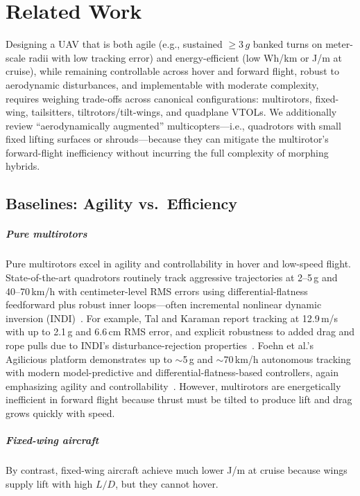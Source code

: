
\chapter{Related Work}\label{chapter:related-work}

Designing a UAV that is both agile (e.g., sustained $\geq 3\,g$ banked turns on meter-scale radii with low tracking error) and energy-efficient (low Wh/km or J/m at cruise), while remaining controllable across hover and forward flight, robust to aerodynamic disturbances, and implementable with moderate complexity, requires weighing trade-offs across canonical configurations: multirotors, fixed-wing, tailsitters, tiltrotors/tilt-wings, and quadplane VTOLs.
We additionally review ``aerodynamically augmented'' multicopters---i.e., quadrotors with small fixed lifting surfaces or shrouds---because they can mitigate the multirotor's forward-flight inefficiency without incurring the full complexity of morphing hybrids.


\section{Baselines: Agility vs.\ Efficiency}

\paragraph{Pure multirotors}
Pure multirotors excel in agility and controllability in hover and low-speed flight.
State-of-the-art quadrotors routinely track aggressive trajectories at 2--5\,g and 40--70\,km/h with centimeter-level RMS errors using differential-flatness feedforward plus robust inner loops---often incremental nonlinear dynamic inversion (INDI)~\cite{Tal2018,Tal2021,Foehn2022}.
For example, Tal and Karaman report tracking at 12.9\,m/s with up to 2.1\,g and 6.6\,cm RMS error, and explicit robustness to added drag and rope pulls due to INDI's disturbance-rejection properties~\cite{Tal2018}.
Foehn et al.'s Agilicious platform demonstrates up to $\sim$5\,g and $\sim$70\,km/h autonomous tracking with modern model-predictive and differential-flatness-based controllers, again emphasizing agility and controllability~\cite{Foehn2022}.
However, multirotors are energetically inefficient in forward flight because thrust must be tilted to produce lift and drag grows quickly with speed.

\paragraph{Fixed-wing aircraft}
By contrast, fixed-wing aircraft achieve much lower J/m at cruise because wings supply lift with high $L/D$, but they cannot hover.

